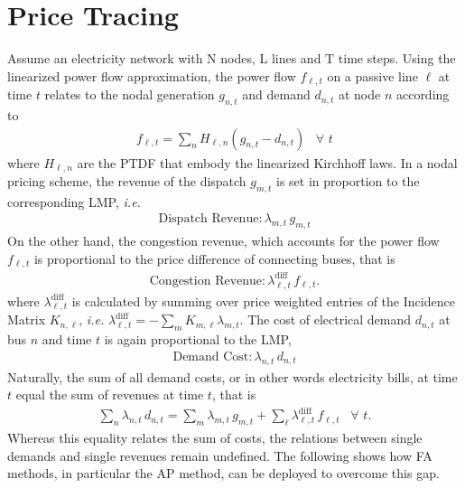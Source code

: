 \documentclass[11pt,twocolumn]{article}
\newcommand{\ie}{\textit{i.e.} }
\newcommand{\Forall}[1]{\hspace{10pt} \forall \,\, #1 }
\newcommand{\nodalgeneration}[1][n]{g_{#1,t}}
\newcommand{\flow}{f_{\ell,t}}
\newcommand{\lmp}[1][n]{\lambda_{#1,t}}
\newcommand{\lmpdiff}[1][\ell]{\lmp[#1]^\text{diff}}
\newcommand{\demand}[1][n]{d_{#1,t}}
\newcommand{\incidence}[1][n]{K_{#1,\ell}}
\newcommand{\ptdf}[1][n]{H_{\ell,#1}}
\begin{document}
\section{Price Tracing}

Assume an electricity network with N nodes, L lines and T time steps. Using the linearized power flow approximation, the power flow $\flow$ on a passive line $\ell$ at time $t$ relates to the nodal generation $\nodalgeneration$ and demand $\demand$ at node $n$ according to 
\begin{align}
    \flow = \sum_n \ptdf \left(\nodalgeneration - \demand \right) \Forall{t}
\end{align}
where $\ptdf$ are the \ac{PTDF} that embody the linearized Kirchhoff laws. 
In a nodal pricing scheme, the revenue of the dispatch $\nodalgeneration[m]$ is set in proportion to the corresponding \ac{LMP}, \ie
\begin{align}
    \text{Dispatch Revenue}: \lmp[m] \, \nodalgeneration[m] 
\end{align}
On the other hand, the congestion revenue, which accounts for the power flow $\flow$ is proportional to the price difference of connecting buses, that is  
\begin{align}
    \text{Congestion Revenue}: \lmpdiff\, \flow .
\end{align}
where $\lmpdiff$ is calculated by summing over price weighted entries of the Incidence Matrix $\incidence$, \ie $\lmp[\ell]^{\text{diff}} = - \sum_m \incidence[m] \lmp[m]$.
The cost of electrical demand $\demand$ at bus $n$ and time $t$ is again proportional to the LMP, 
\begin{align}
    \text{Demand Cost}: \lmp\, \demand
\end{align}
Naturally, the sum of all demand costs, or in other words electricity bills, at time $t$ equal the sum of revenues at time $t$, that is 
\begin{align}
    \sum_{n} \lmp\, \demand  = \sum_{m} \lmp[m]\, \nodalgeneration[m] + \sum_{\ell} \lmpdiff\, \flow \Forall{t} .
    \label{eq:total-demand-cost}
\end{align}
Whereas this equality relates the sum of costs, the relations between single demands and single revenues remain undefined. The following shows how \ac{FA} methods, in particular the \ac{AP} method, can be deployed to overcome this gap. 
\end{document}
